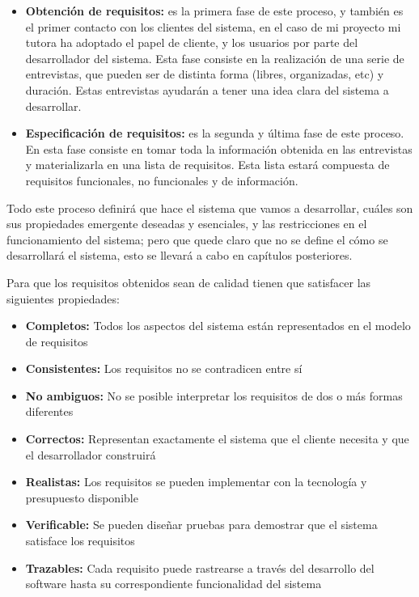 \begin{itemize}
    \item \textbf{Obtención de requisitos:} es la primera fase de este proceso, y también es el primer contacto con los clientes del sistema, en el caso de mi proyecto mi tutora ha adoptado el papel de cliente, y los usuarios por parte del desarrollador del sistema. Esta fase consiste en la realización de una serie de entrevistas, que pueden ser de distinta forma (libres, organizadas, etc) y duración. Estas entrevistas ayudarán a tener una idea clara del sistema a desarrollar.
    \item \textbf{Especificación de requisitos:} es la segunda y última fase de este proceso. En esta fase consiste en tomar toda la información obtenida en las entrevistas y materializarla en una lista de requisitos. Esta lista estará compuesta de requisitos funcionales, no funcionales y de información. 
\end{itemize}

Todo este proceso definirá que hace el sistema que vamos a desarrollar, cuáles son sus propiedades emergente deseadas y esenciales, y las restricciones en el funcionamiento del sistema; pero que quede claro que no se define el cómo se desarrollará el sistema, esto se llevará a cabo en capítulos posteriores.

Para que los requisitos obtenidos sean de calidad tienen que satisfacer las siguientes propiedades:

\begin{itemize}
    \item \textbf{Completos:} Todos los aspectos del sistema están representados en el modelo de requisitos
    \item \textbf{Consistentes:} Los requisitos no se contradicen entre sí
    \item \textbf{No ambiguos:} No se posible interpretar los requisitos de dos o más formas diferentes
    \item \textbf{Correctos:} Representan exactamente el sistema que el cliente necesita y que el desarrollador construirá
    \item \textbf{Realistas:} Los requisitos se pueden implementar con la tecnología y presupuesto disponible
    \item \textbf{Verificable:} Se pueden diseñar pruebas para demostrar que el sistema satisface los requisitos
    \item \textbf{Trazables:} Cada requisito puede rastrearse a través del desarrollo del software hasta su correspondiente funcionalidad del sistema
\end{itemize}

